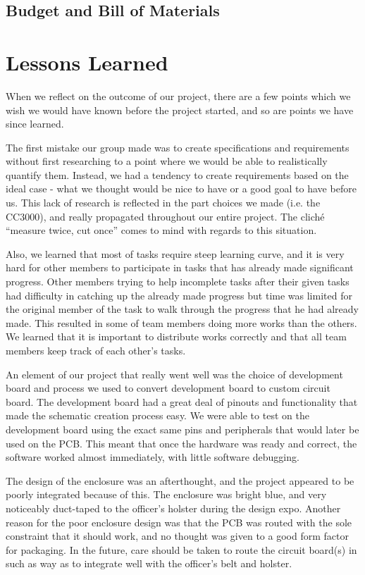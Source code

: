 \documentclass[12pt]{article}
\begin{document}
\subsection{Budget and Bill of Materials}



\section{Lessons Learned}
When we reflect on the outcome of our project, there are a few points which we
wish we would have known before the project started, and so are points we have
since learned. 

The first mistake our group made was to create specifications and requirements
without first researching to a point where we would be able to realistically
quantify them. Instead, we had a tendency to create requirements based on the
ideal case - what we thought would be nice to have or a good goal to have
before us. This lack of research is reflected in the part choices we made (i.e.
the CC3000), and really propagated throughout our entire project. The cliché
``measure twice, cut once'' comes to mind with regards to this situation.

Also, we learned that most of tasks require steep learning curve, and it is
very hard for other members to participate in tasks that has already made
significant progress. Other members trying to help incomplete tasks after their
given tasks had difficulty in catching up the already made progress but time
was limited for the original member of the task to walk through the progress
that he had already made. This resulted in some of team members doing more
works than the others. We learned that it is important to distribute works
correctly and that all team members keep track of each other's tasks.

An element of our project that really went well was the choice of development
board and process we used to convert development board to custom circuit board.
The development board had a great deal of pinouts and functionality that made
the schematic creation process easy. We were able to test on the development
board using the exact same pins and peripherals that would later be used on the
PCB. This meant that once the hardware was ready and correct, the software
worked almost immediately, with little software debugging.

The design of the enclosure was an afterthought, and the project appeared to be
poorly integrated because of this. The enclosure was bright blue, and very
noticeably duct-taped to the officer's holster during the design expo. Another
reason for the poor enclosure design was that the PCB was routed with the sole
constraint that it should work, and no thought was given to a good form factor
for packaging. In the future, care should be taken to route the circuit
board(s) in such as way as to integrate well with the officer's belt and
holster.
\end{document}
